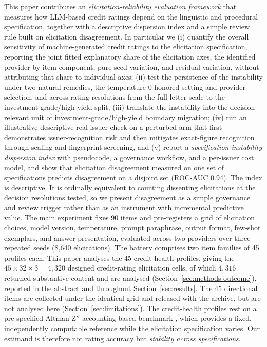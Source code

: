 \documentclass[a4paper,fleqn]{cas-sc}
\begin{document}
This paper contributes an \emph{elicitation-reliability evaluation framework} that measures how
LLM-based credit ratings depend on the linguistic and procedural specification, together with a
descriptive dispersion index and a simple review rule built on elicitation disagreement. In
particular we (i) quantify the overall sensitivity of machine-generated credit ratings to the
elicitation specification, reporting the joint fitted explanatory share of the elicitation axes, the
identified provider-by-item component, pure seed variation, and residual variation, without
attributing that share to individual axes; (ii) test the persistence of the instability under two natural remedies, the temperature-0-honored
setting and provider selection, and across rating resolutions from the full letter scale to the
investment-grade/high-yield split; (iii) translate the instability into the decision-relevant unit of
investment-grade/high-yield boundary migration;
(iv) run an illustrative descriptive real-issuer check on a perturbed arm that first demonstrates
issuer-recognition risk and then mitigates exact-figure recognition through scaling and fingerprint
screening, and (v) report a \emph{specification-instability dispersion index} with pseudocode, a
governance workflow, and a per-issuer cost model, and show that elicitation disagreement measured on
one set of specifications predicts disagreement on a disjoint set (ROC-AUC 0.94). The index is
descriptive. It is ordinally equivalent to counting dissenting elicitations at the decision
resolutions tested, so we present disagreement as a simple governance and review trigger rather than
as an instrument with incremental predictive value.
The main experiment fixes 90 items and pre-registers a grid of elicitation choices, model version,
temperature, prompt paraphrase, output format, few-shot exemplars, and answer presentation, evaluated
across two providers over three repeated seeds (8{,}640 elicitations). The battery comprises two
item families of 45 profiles each. This paper analyses the 45 credit-health profiles, giving the
$45\times32\times3=4{,}320$ designed credit-rating elicitation cells, of which $4{,}316$ returned
substantive content and are analysed (Section~\ref{sec:methods-outcome}), reported in the abstract and throughout
Section~\ref{sec:results}. The 45 directional items are collected under the identical grid and
released with the archive, but are not analysed here (Section~\ref{sec:limitations}). The credit-health profiles rest on a pre-specified Altman Z$''$ accounting-based benchmark \citep{altman2005ems,altmanhotchkiss2006}, which provides a fixed, independently computable reference while the elicitation specification varies. Our estimand is therefore
not rating accuracy but \emph{stability across specifications}.
\end{document}

